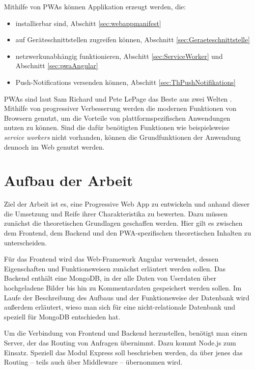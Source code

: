 Mithilfe von PWAs können Applikation erzeugt werden, die: 
\begin{itemize}
    \item installierbar sind, Abschitt \ref{sec:webappmanifest} 
    \item auf Geräteschnittstellen zugreifen können, Abschnitt \ref{sec:Geraeteschnittstelle} 
    \item netzwerkunabhängig funktionieren, Abschitt \ref{sec:ServiceWorker} und Abschnitt \ref{sec:pwaAngular}
    \item Push-Notifications versenden können, Abschitt \ref{sec:ThPushNotifikations}
\end{itemize}

PWAs sind laut Sam Richard und Pete LePage das Beste aus zwei Welten \cite{SamRichard2020}. Mithilfe von progressiver Verbesserung werden die modernen Funktionen von Browsern genutzt, um die Vorteile von plattformspezifischen Anwendungen nutzen zu können. Sind die dafür benötigten Funktionen wie beispielsweise \textit{service workers} nicht vorhanden, können die Grundfunktionen der Anwendung dennoch im Web genutzt werden. 

\section{Aufbau der Arbeit}\label{se:AufbauDerArbeit}
Ziel der Arbeit ist es, eine Progressive Web App zu entwickeln und anhand dieser die Umsetzung und Reife ihrer Charakteristika zu bewerten. 
Dazu müssen zunächst die theoretischen Grundlagen geschaffen werden. Hier gilt es zwischen dem Frontend, dem Backend und den PWA-spezifischen theoretischen Inhalten zu unterscheiden.

Für das Frontend wird das Web-Framework Angular verwendet, dessen Eigenschaften und Funktionsweisen zunächst erläutert werden sollen. Das Backend enthält eine MongoDB, in der alle Daten von Userdaten über hochgeladene Bilder bis hin zu Kommentardaten gespeichert werden sollen. Im Laufe der Beschreibung des Aufbaus und der Funktionsweise der Datenbank wird außerdem erläutert, wieso man sich für eine nicht-relationale Datenbank und speziell für MongoDB entschieden hat.

Um die Verbindung von Frontend und Backend herzustellen, benötigt man einen Server, der das Routing von Anfragen übernimmt. Dazu kommt Node.js zum Einsatz. Speziell das Modul Express soll beschrieben werden, da über jenes das Routing – teils auch über Middleware – übernommen wird.

